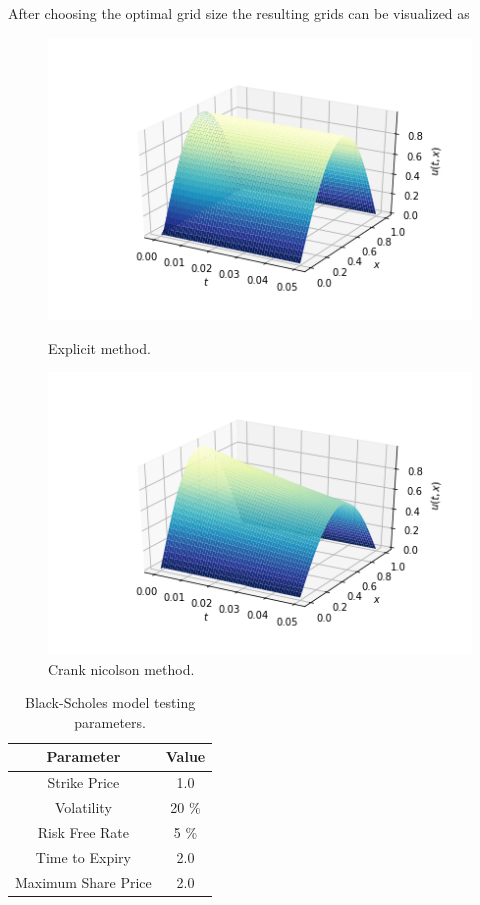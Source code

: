 \documentclass[12pt, oneside]{book}
\theoremstyle{plain}
\theoremstyle{definition}
\begin{document}
After choosing the optimal grid size the resulting grids can be visualized as
\begin{figure}[!htb]
  \begin{minipage}[b]{0.5\textwidth}
    \includegraphics[width=\textwidth]{HeatExplicitGrid.png}
    \caption{Explicit method.}
  \end{minipage}
  \begin{minipage}[b]{0.5\textwidth}
    \includegraphics[width=\textwidth]{HeatCNGrid.png}
    \caption{Crank nicolson method.}
  \end{minipage}
\end{figure}

\begin{table}[h!]
\centering
 \begin{tabular}{||c c||} 
 \hline
 Parameter & Value\\ [0.5ex]
 \hline\hline
 Strike Price & 1.0\\ 
 Volatility & 20 \% \\
 Risk Free Rate & 5 \% \\
 Time to Expiry & 2.0\\
 Maximum Share Price & 2.0\\ [1ex] 
 \hline
 \end{tabular}
 \caption{Black-Scholes model testing parameters.}
\end{table}
\end{document}

